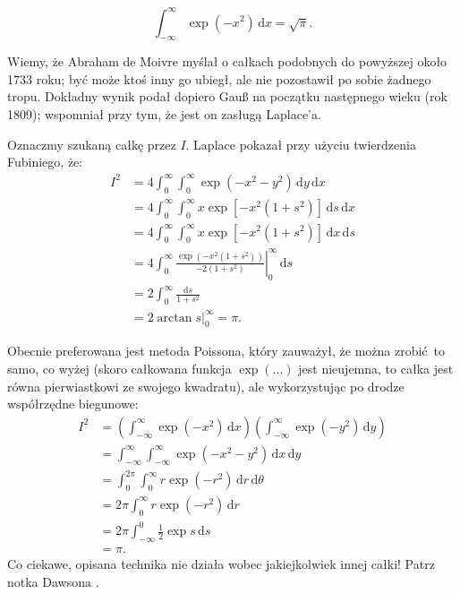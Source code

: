 \begin{problem}
    \label{gauss_euler_poisson}%
    \begin{equation}
        \int_{-\infty}^\infty \exp \left( -x^2 \right) \,\mathrm{d} x = \sqrt{\pi}.
    \end{equation}
\end{problem}

Wiemy, że Abraham de Moivre myślał o całkach podobnych do powyższej około 1733 roku; być może ktoś inny go ubiegł, ale nie pozostawił po sobie żadnego tropu.
%
Dokładny wynik podał dopiero Gauß na początku następnego wieku (rok 1809); wspomniał przy tym, że jest on zasługą Laplace'a.
%

Oznaczmy szukaną całkę przez $I$.
Laplace pokazał przy użyciu twierdzenia Fubiniego, że:
\begin{align}
    I^2 & = 4 \int_0^\infty \int_0^\infty \exp(-x^2 -y^2)\,\mathrm{d}y \,\mathrm{d}x \\
    & = 4 \int_0^\infty \int_0^\infty x \exp [-x^2(1+s^2)]\,\mathrm{d}s \,\mathrm{d}x \\
    & = 4 \int_0^\infty \int_0^\infty x \exp [-x^2(1+s^2)]\,\mathrm{d}x \,\mathrm{d}s \\
    & = 4 \int_0^\infty \left. \frac{\exp(-x^2(1+s^2))}{-2(1+s^2)}\right|_{0}^{\infty} \,\mathrm{d}s \\
    & = 2 \int_0^\infty \frac{\mathrm{d}s}{1+s^2} \\
    & = 2 \left. \arctan s \right|_{0}^\infty = \pi.
\end{align}

Obecnie preferowana jest metoda Poissona, który zauważył, że można zrobić to samo, co wyżej (skoro całkowana funkcja $\exp (\ldots)$ jest nieujemna, to całka jest równa pierwiastkowi ze swojego kwadratu), ale wykorzystując po drodze współrzędne biegunowe:
%
\begin{align}
    I^2 & = \left(\int_{-\infty}^\infty \exp \left( -x^2 \right) \,\mathrm{d}x\right)\left(\int_{-\infty}^\infty \exp \left( -y^2 \right) \,\mathrm{d}y\right) \\
    & = \int_{-\infty}^\infty \int_{-\infty}^\infty \exp \left(-x^2-y^2\right) \,\mathrm{d}x\,\mathrm{d}y \\
    & = \int_0^{2\pi} \int_0^\infty r \exp (-r^2) \,\mathrm{d}r\, \mathrm{d}\theta \\
    & = 2\pi \int_0^\infty r \exp (-r^2) \,\mathrm{d} r \\
    & = 2\pi \int^0_{-\infty} \frac 1 2 \exp s \,\mathrm{d} s \\
    & = \pi.
\end{align}
Co ciekawe, opisana technika nie działa wobec jakiejkolwiek innej całki! Patrz notka Dawsona \cite{dawson05}.

